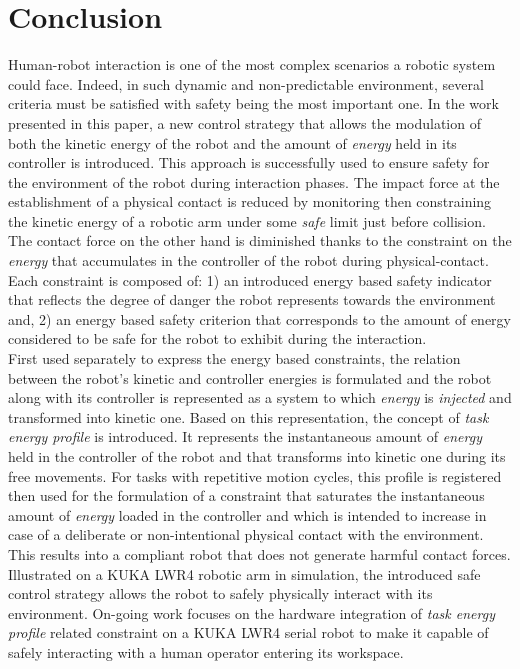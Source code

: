 \documentclass[letterpaper, 10 pt, conference]{ieeeconf}      %
\begin{document}
\section{Conclusion}
\label{sec:conslusion}
Human-robot interaction is one of the most complex scenarios a robotic system could face. Indeed, in such dynamic and non-predictable environment, several criteria must be satisfied with safety being the most important one. In the work presented in this paper, a new control strategy that allows the modulation of both the kinetic energy of the robot and the amount of \textit{energy} held in its controller is introduced. This approach is successfully used to ensure safety for the environment of the robot during interaction phases. The impact force at the establishment of a physical contact is reduced by monitoring then constraining the kinetic energy of a robotic arm under some \textit{safe} limit just before collision. The contact force on the other hand is diminished thanks to the constraint on the \textit{energy} that accumulates in the controller of the robot during physical-contact. Each constraint is composed of: 1) an introduced energy based safety indicator that reflects the degree of danger the robot represents towards the environment and, 2) an energy based safety criterion that corresponds to the amount of energy considered to be safe for the robot to exhibit during the interaction. \\
First used separately to express the energy based constraints, the relation between the robot's kinetic and controller energies is formulated and the robot along with its controller is represented as a system to which \textit{energy} is \textit{injected} and transformed into kinetic one. Based on this representation, the concept of \textit{task energy profile} is introduced. It represents the instantaneous amount of \textit{energy} held in the controller of the robot and that transforms into kinetic one during its free movements. For tasks with repetitive motion cycles, this profile is registered then used for the formulation of a constraint that saturates the instantaneous amount of \textit{energy} loaded in the controller and which is intended to increase in case of a deliberate or non-intentional physical contact with the environment. This results into a compliant robot that does not generate harmful contact forces. Illustrated on a KUKA LWR4 robotic arm in simulation, the introduced safe control strategy allows the robot to safely physically interact with its environment. On-going work focuses on the hardware integration of \textit{task energy profile} related constraint on a KUKA LWR4 serial robot to make it capable of safely interacting with a human operator entering its workspace.
\end{document}

